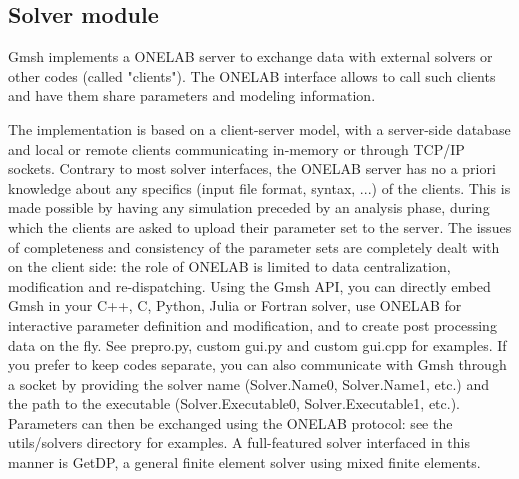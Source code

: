 \documentclass[dvipdfmx, 9pt, a4paper]{article}
\numberwithin{equation}{section}
\begin{document}
\subsection{Solver module}
Gmsh implements a ONELAB server to exchange data with external solvers or other codes (called "clients"). The ONELAB interface allows to call such clients and have them share parameters and modeling information.\par
The implementation is based on a client-server model, with a server-side database and local or remote clients communicating in-memory or through TCP/IP sockets. Contrary to most solver interfaces, the ONELAB server has no a priori knowledge about any specifics (input file format, syntax, ...) of the clients. This is made possible by having any simulation preceded by an analysis phase, during which the clients are asked to upload their parameter set to the server. The issues of completeness and consistency of the parameter sets are completely dealt with on the client side: the role of ONELAB is limited to data centralization, modification and re-dispatching.
Using the Gmsh API, you can directly embed Gmsh in your C++, C, Python, Julia or Fortran solver, use ONELAB for interactive parameter definition and modification, and to create post processing data on the fly. See prepro.py, custom gui.py and custom gui.cpp for examples. If you prefer to keep codes separate, you can also communicate with Gmsh through a socket by providing the solver name (Solver.Name0, Solver.Name1, etc.) and the path to the executable (Solver.Executable0, Solver.Executable1, etc.). Parameters can then be exchanged using the ONELAB protocol: see the utils/solvers directory for examples. A full-featured solver interfaced in this manner is GetDP, a general finite element solver using mixed finite elements.
\end{document}
